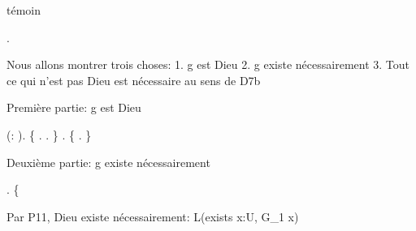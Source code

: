 \documentclass[10pt]{report}
\begin{document}
\begin{coqdoccode}
\begin{coqdoccomment}
témoin\coqdocindent{0.50em}
\end{coqdoccomment}
\coqdoceol
\coqdocindent{1.00em}
\coqdoctac{\ensuremath{\exists}} .\coqdoceol
\coqdocemptyline
\coqdocindent{1.00em}
\begin{coqdoccomment}
\coqdocindent{0.50em}
Nous\coqdocindent{0.50em}
allons\coqdocindent{0.50em}
montrer\coqdocindent{0.50em}
trois\coqdocindent{0.50em}
choses:\coqdoceol
\coqdocindent{2.50em}
1.\coqdocindent{0.50em}
g\coqdocindent{0.50em}
est\coqdocindent{0.50em}
Dieu\coqdoceol
\coqdocindent{2.50em}
2.\coqdocindent{0.50em}
g\coqdocindent{0.50em}
existe\coqdocindent{0.50em}
nécessairement\coqdoceol
\coqdocindent{2.50em}
3.\coqdocindent{0.50em}
Tout\coqdocindent{0.50em}
ce\coqdocindent{0.50em}
qui\coqdocindent{0.50em}
n'est\coqdocindent{0.50em}
pas\coqdocindent{0.50em}
Dieu\coqdocindent{0.50em}
est\coqdocindent{0.50em}
nécessaire\coqdocindent{0.50em}
au\coqdocindent{0.50em}
sens\coqdocindent{0.50em}
de\coqdocindent{0.50em}
D7b\coqdocindent{0.50em}
\end{coqdoccomment}
\coqdoceol
\coqdocemptyline
\coqdocindent{1.00em}
\begin{coqdoccomment}
\coqdocindent{0.50em}
Première\coqdocindent{0.50em}
partie:\coqdocindent{0.50em}
g\coqdocindent{0.50em}
est\coqdocindent{0.50em}
Dieu\coqdocindent{0.50em}
\end{coqdoccomment}
\coqdoceol
\coqdocindent{1.00em}
 (:  ).\coqdoceol
\coqdocindent{1.00em}
\{  . . \}\coqdoceol
\coqdocindent{1.00em}
\coqdoceol
\coqdocindent{1.00em}
. \{  . \}\coqdoceol
\coqdocindent{1.00em}
\coqdoceol
\coqdocindent{1.00em}
\begin{coqdoccomment}
\coqdocindent{0.50em}
Deuxième\coqdocindent{0.50em}
partie:\coqdocindent{0.50em}
g\coqdocindent{0.50em}
existe\coqdocindent{0.50em}
nécessairement\coqdocindent{0.50em}
\end{coqdoccomment}
\coqdoceol
\coqdocindent{1.00em}
.\coqdoceol
\coqdocindent{1.00em}
\{\coqdoceol
\coqdocindent{2.00em}
\begin{coqdoccomment}
\coqdocindent{0.50em}
Par\coqdocindent{0.50em}
P11,\coqdocindent{0.50em}
Dieu\coqdocindent{0.50em}
existe\coqdocindent{0.50em}
nécessairement:\coqdocindent{0.50em}
L(exists\coqdocindent{0.50em}
x:U,\coqdocindent{0.50em}
G\_1\coqdocindent{0.50em}
x)\coqdocindent{0.50em}
\end{coqdoccomment}

\end{coqdoccode}
\end{document}
